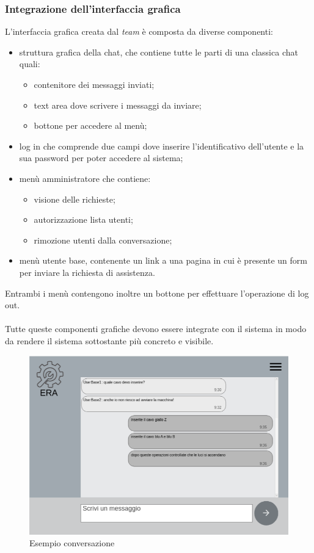       \subsubsection{Integrazione dell'interfaccia grafica}
        L'interfaccia grafica creata dal \textit{team} è composta da diverse componenti:
        \begin{itemize}
          \item struttura grafica della chat, che contiene tutte le parti di una classica chat quali:
          \begin{itemize}
            \item contenitore dei messaggi inviati;
            \item text area dove scrivere i messaggi da inviare;
            \item bottone per accedere al menù;
          \end{itemize}
          \item log in che comprende due campi dove inserire l'identificativo dell'utente e la sua password per poter accedere al sistema;
          \item menù amministratore che contiene:
          \begin{itemize}
            \item visione delle richieste;
            \item autorizzazione lista utenti;
            \item rimozione utenti dalla conversazione;
          \end{itemize}
          \item menù utente base, contenente un link a una pagina in cui è presente un form per inviare la richiesta di assistenza.
        \end{itemize}
        Entrambi i menù contengono inoltre un bottone per effettuare l'operazione di log out.\\\\
        Tutte queste componenti grafiche devono essere integrate con il sistema in modo da rendere il sistema sottostante più concreto e visibile.
        \begin{figure}[h]
          \centering
          \includegraphics[scale=0.5]{immagini/chat.png}
          \caption{Esempio conversazione}
          \label{chat}
        \end{figure}

